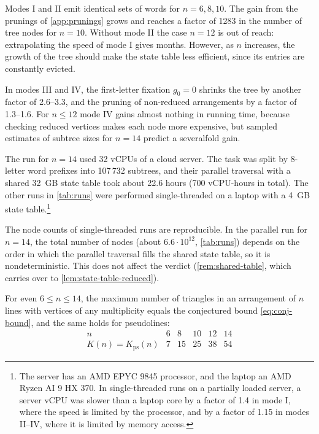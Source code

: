 Modes I and II emit identical sets of words for $n=6,8,10$. The gain from the prunings of \cref{app:prunings} grows and reaches a factor of 1283 in the number of tree nodes for $n=10$.
Without mode II the case $n=12$ is out of reach: extrapolating the speed of mode I gives months.
However, as $n$ increases, the growth of the tree should make the state table less efficient, since its entries are constantly evicted.

In modes III and IV, the first-letter fixation $g_0=0$ shrinks the tree by another factor of 2.6--3.3, and the pruning of non-reduced arrangements by a factor of 1.3--1.6.
For $n\le12$ mode IV gains almost nothing in running time, because checking reduced vertices makes each node more expensive, but sampled estimates of subtree sizes for $n=14$ predict a severalfold gain.

The run for $n=14$ used 32 vCPUs of a cloud server.
The task was split by 8-letter word prefixes into 107\,732 subtrees, and their parallel traversal with a shared 32~GB state table took about 22.6 hours (700 vCPU-hours in total).
The other runs in \cref{tab:runs} were performed single-threaded on a laptop with a 4~GB state table.\footnote{The server has an AMD EPYC 9845 processor, and the laptop an AMD Ryzen AI 9 HX 370. In single-threaded runs on a partially loaded server, a server vCPU was slower than a laptop core by a factor of 1.4 in mode I, where the speed is limited by the processor, and by a factor of 1.15 in modes II--IV, where it is limited by memory access.}

The node counts of single-threaded runs are reproducible.
In the parallel run for $n=14$, the total number of nodes (about $6.6\cdot10^{12}$, \cref{tab:runs}) depends on the order in which the parallel traversal fills the shared state table, so it is nondeterministic. This does not affect the verdict (\cref{rem:shared-table}, which carries over to \cref{lem:state-table-reduced}).

\begin{theorem}\label{thm:small-n}
For even $6\le n\le14$, the maximum number of triangles in an arrangement of $n$ lines with vertices of any multiplicity equals the conjectured bound \eqref{eq:conj-bound}, and the same holds for pseudolines:
\begin{equation}\label{eq:small-n}
\begin{array}{c|ccccc}
n & 6 & 8 & 10 & 12 & 14\\ \hline
K(n)=K_{\mathrm{ps}}(n) & 7 & 15 & 25 & 38 & 54
\end{array}
\end{equation}
\end{theorem}

